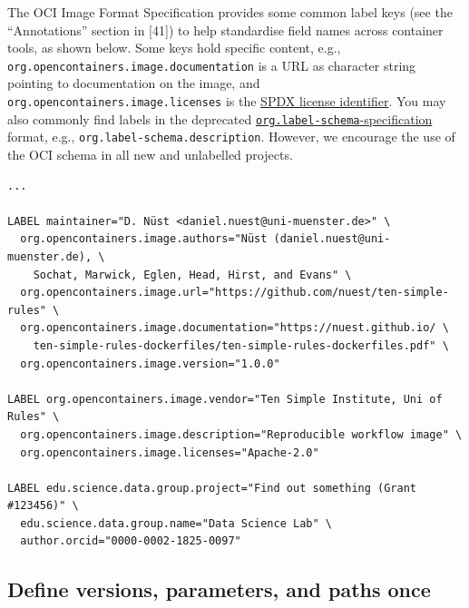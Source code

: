 \documentclass[10pt,letterpaper]{article}
\begin{document}
The OCI Image Format Specification provides some common label keys (see
the ``Annotations'' section in {[}41{]}) to help standardise field names
across container tools, as shown below. Some keys hold specific content,
e.g., \texttt{org.opencontainers.image.documentation} is a URL as
character string pointing to documentation on the image, and
\texttt{org.opencontainers.image.licenses} is the
\href{https://spdx.org/licenses/}{SPDX license identifier}. You may also
commonly find labels in the deprecated
\href{http://label-schema.org/rc1/}{\texttt{org.label-schema}-specification}
format, e.g., \texttt{org.label-schema.description}. However, we
encourage the use of the OCI schema in all new and unlabelled projects.

\scriptsize

\begin{minipage}{\linewidth}

\begin{lstlisting}[language=docker,caption={Partial \texttt{Dockerfile} with commonly used labels.},breaklines=true,label={lst:labels}]
...

LABEL maintainer="D. Nüst <daniel.nuest@uni-muenster.de>" \
  org.opencontainers.image.authors="Nüst (daniel.nuest@uni-muenster.de), \
    Sochat, Marwick, Eglen, Head, Hirst, and Evans" \
  org.opencontainers.image.url="https://github.com/nuest/ten-simple-rules" \
  org.opencontainers.image.documentation="https://nuest.github.io/ \
    ten-simple-rules-dockerfiles/ten-simple-rules-dockerfiles.pdf" \
  org.opencontainers.image.version="1.0.0"

LABEL org.opencontainers.image.vendor="Ten Simple Institute, Uni of Rules" \
  org.opencontainers.image.description="Reproducible workflow image" \
  org.opencontainers.image.licenses="Apache-2.0"

LABEL edu.science.data.group.project="Find out something (Grant #123456)" \
  edu.science.data.group.name="Data Science Lab" \
  author.orcid="0000-0002-1825-0097"
\end{lstlisting}

\end{minipage}

\normalsize

\hypertarget{define-versions-parameters-and-paths-once}{%
\subsection{Define versions, parameters, and paths
once}\label{define-versions-parameters-and-paths-once}}
\end{document}

